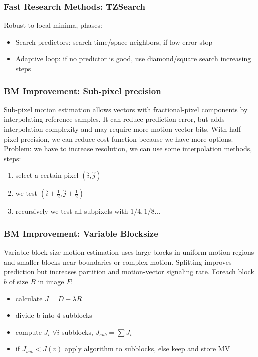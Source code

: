 \subsubsection{Fast Research Methods: TZSearch}
Robust to local minima, phases:
\begin{itemize}
    \item Search predictors: search time/space neighbors, if low error stop
    \item Adaptive loop: if no predictor is good, use diamond/square search increasing steps
\end{itemize}
\subsubsection{BM Improvement: Sub-pixel precision}
Sub-pixel motion estimation allows vectors with fractional-pixel components by interpolating reference samples. It can reduce prediction error, but adds interpolation complexity and may require more motion-vector bits.
With half pixel precision, we can reduce cost function because we have more options.\\
Problem: we have to increase resolution, we can use some interpolation methods, steps:
\begin{enumerate}
    \item select a certain pixel $(\hat{i}, \hat{j})$
    \item we test $(\hat{i}\pm \frac{1}{2}, \hat{j}\pm \frac{1}{2})$
    \item recursively we test all subpixels with $1/4, 1/8$...
\end{enumerate}
\subsubsection{BM Improvement: Variable Blocksize}
Variable block-size motion estimation uses large blocks in uniform-motion regions and smaller blocks near boundaries or complex motion. Splitting improves prediction but increases partition and motion-vector signaling rate.
Foreach block $b$ of size $B$ in image $F$:
\begin{itemize}
    \item calculate $J = D + \lambda R$
    \item divide b into 4 subblocks
    \item compute $J_i$ $\forall i$ subblocks, $J_{sub} = \sum J_i$
    \item if $J_{sub} < J(v)$ apply algorithm to subblocks, else keep and store MV
\end{itemize}
